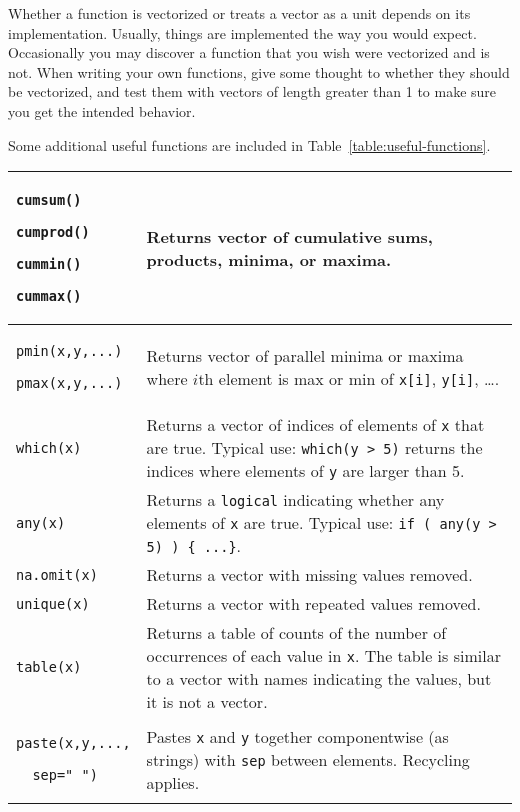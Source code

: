 Whether a function is vectorized or treats a vector as a unit
depends on its implementation.  Usually, things are implemented 
the way you would expect.  Occasionally you may discover a function
that you wish were vectorized and is not.    
When writing your own functions, give some thought to whether they
should be vectorized, and test them with vectors of length greater than 1
to make sure you get the intended behavior.
%
%
%
%
%
%
%
%
%
%
%
%
%
%
%
%
%
%
%


Some additional useful functions are included in Table~\ref{table:useful-functions}.

\begin{table}
\caption{Some useful \R\ functions.}
\label{table:useful-functions}%
\begin{center}
\UndefineShortVerb{\&}
  \begin{longtable}{|p{1.2in}|p{3.5in}|}
  \hline
  \verb!cumsum()!

  \verb!cumprod()!

  \verb!cummin()!

  \verb!cummax()!
  &
  Returns vector of cumulative sums, products, minima, or maxima.
  \\ \hline
  \verb!pmin(x,y,...)!

  \verb!pmax(x,y,...)!
  &
  Returns vector of parallel minima or maxima where $i$th element is
  max or min of \verb!x[i]!, \verb!y[i]!, \dots.
  \\ \hline
  \verb!which(x)! 
  &
  Returns a vector of indices of elements of \verb!x! that are true.
  Typical use: \verb!which(y > 5)! returns the indices where elements
  of \verb&y& are larger than 5.
  \\ \hline
  \verb!any(x)! 
  &
  Returns a \verb!logical! indicating whether any elements of \verb!x! 
  are true.
  Typical use: \verb!if ( any(y > 5) ) { ...}!.
  \\ \hline
  \verb!na.omit(x)! & Returns a vector with missing values removed.
  \\ \hline
  \verb!unique(x)! & Returns a vector with repeated values removed.
  \\ \hline
  \verb!table(x)! & Returns a table of counts of the number of 
  occurrences of each value in \verb!x!.  The table is similar
  to a vector with names indicating the values, but it is not a vector.
  \\ \hline
  \verb!paste(x,y,...,!
  
  \verb!  sep=" ")! 
  & Pastes \verb!x! and \verb!y! together
  componentwise (as strings) with \verb!sep! between elements.
  Recycling applies.
  \\ \hline
  \end{longtable}
\DefineShortVerb{\&}
\end{center}
\end{table}



